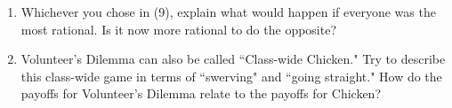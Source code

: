 \begin{enumerate}
\item Whichever you chose in (9), explain what would happen if everyone was the most rational. Is it now more rational to do the opposite?

\item  Volunteer's Dilemma can also be called ``Class-wide Chicken." Try to describe this class-wide game in terms of ``swerving" and ``going straight." How do the payoffs for Volunteer's Dilemma relate to the payoffs for Chicken?


\end{enumerate}



 